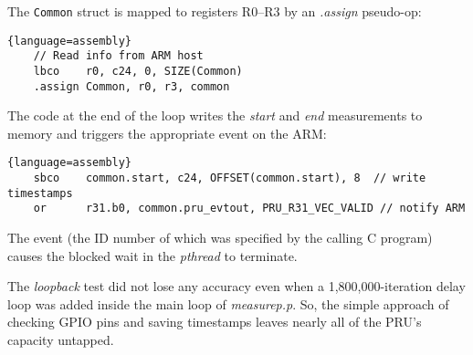 \documentclass[letterpaper,11pt,fleqn]{article}
\begin{document}
The \texttt{Common} struct is mapped to registers R0--R3 by an \textit{.assign}
pseudo-op:

\begin{lstlisting}{language=assembly}
    // Read info from ARM host
    lbco    r0, c24, 0, SIZE(Common)
    .assign Common, r0, r3, common
\end{lstlisting}

The code at the end of the loop writes the \textit{start} and \textit{end}
measurements to memory and triggers the appropriate event on the ARM:

\begin{lstlisting}{language=assembly}
    sbco    common.start, c24, OFFSET(common.start), 8  // write timestamps
    or      r31.b0, common.pru_evtout, PRU_R31_VEC_VALID // notify ARM
\end{lstlisting}

The event (the ID number of which was specified by the calling C program)
causes the blocked wait in the \textit{pthread} to terminate.

The \textit{loopback} test did not lose any accuracy even when a
1,800,000-iteration delay loop was added inside the main loop of
\textit{measurep.p}. So, the simple approach of checking GPIO pins and saving
timestamps leaves nearly all of the PRU's capacity untapped.
\end{document}
